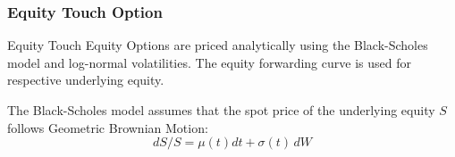 \subsubsection{Equity Touch Option}
\label{pricing:eq_touchoption}

Equity Touch Equity Options are priced analytically using the Black-Scholes 
model and log-normal volatilities. The equity forwarding curve is used for 
respective underlying equity.

\medskip
The Black-Scholes model assumes that the spot price of the underlying equity $S$ 
follows Geometric Brownian Motion:
$$
dS/S=\mu(t)dt+\sigma(t)\,dW
$$